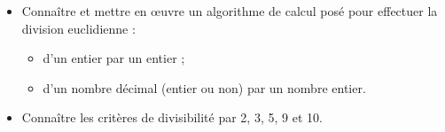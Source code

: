 \begin{prerequis}    
    \begin{itemize}
        \item[\emoji{red-heart}] Connaître et mettre en œuvre un algorithme de calcul posé pour effectuer la division euclidienne :
        \begin{itemize}
            \item d’un entier par un entier ;
            \item d’un nombre décimal (entier ou non) par un nombre entier.
        \end{itemize}
        \columnbreak
        \item[\emoji{red-heart}] Connaître les critères de divisibilité par 2, 3, 5, 9 et 10.
    \end{itemize}
\end{prerequis}